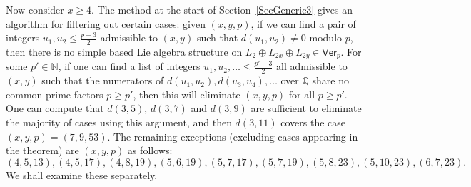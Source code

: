 \documentclass[11pt,a4paper,reqno]{amsart}
\theoremstyle{definition}
\numberwithin{equation}{section}
\newcommand{\Ver}{\mathsf{Ver}}
\newcommand{\mN}{\mathbb{N}}
\newcommand{\mQ}{\mathbb{Q}}
\begin{document}
Now consider $x\geq4$. The method at the start of Section~\ref{SecGeneric3} gives an algorithm for filtering out certain cases: given $(x,y,p)$, if we can find a pair of integers $u_1,u_2\leq\frac{p-3}2$ admissible to $(x,y)$ such that $d(u_1,u_2)\neq0$ modulo $p$, then there is no simple based Lie algebra structure on $L_2\oplus L_{2x}\oplus L_{2y}\in\Ver_p$. For some $p'\in\mN$, if one can find a list of integers $u_1,u_2,\dots\leq\frac{p'-3}2$ all admissible to $(x,y)$ such that the numerators of $d(u_1,u_2),d(u_3,u_4),\dots$ over $\mQ$ share no common prime factors $p\geq p'$, then this will eliminate $(x,y,p)$ for all $p\geq p'$. One can compute that $d(3,5)$, $d(3,7)$ and $d(3,9)$ are sufficient to eliminate the majority of cases using this argument, and then $d(3,11)$ covers the case $(x,y,p)=(7,9,53)$. The remaining exceptions (excluding cases appearing in the theorem) are $(x,y,p)$ as follows:
\[(4,5,13),(4,5,17),(4,8,19),(5,6,19),(5,7,17),(5,7,19),(5,8,23),(5,10,23),(6,7,23).\]
We shall examine these separately.
\end{document}
